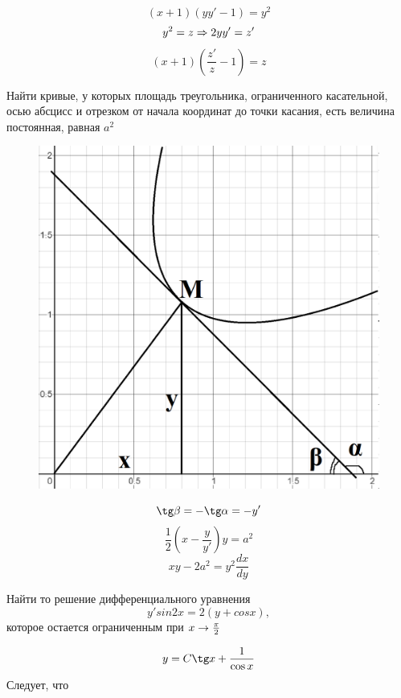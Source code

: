 \documentclass[12pt, fleqn]{article}
\begin{document}
\begin{Example}[162]
    \[(x+1)(y y'-1)=y^2\]
    \[y^2=z \Rightarrow 2y y'=z'\]
    \[(x+1)(\dfrac{z'}{z}-1)=z\]
\end{Example}

\begin{example}
  Найти кривые, у которых площадь треугольника, ограниченного касательной, осью абсцисс и отрезком от начала координат до точки касания, есть величина постоянная, равная $a^2$
  \begin{figure}[H]
	    \includegraphics[scale=0.2]{pics/resh6.png}
	    \centering
	\end{figure}
  \[\tg \beta = - \tg \alpha = -y'\]
  \[\frac{1}{2} (x-\frac{y}{y'})y=a^2\]
  \[x y - 2a^2 = y^2 \frac{dx}{dy}\]
\end{example}

\begin{example}
  Найти то решение дифференциального уравнения
  \[y' sin 2x = 2(y + cos x),\]
  которое остается ограниченным при $x \rightarrow \frac{\pi}{2}$\\
\end{example}

\begin{Sol}
  \[y=C\tg x+\frac{1}{\cos x}\]
  Следует, что
\end{Sol}
\end{document}
